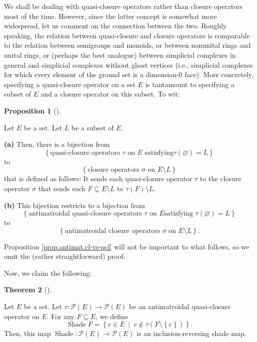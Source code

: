 \documentclass[numbers=enddot,12pt,final,onecolumn]{scrartcl}%
\theoremstyle{definition}
\newtheorem{theo}{Theorem}[section]
\newenvironment{theorem}[1][]
{\begin{theo}[#1]\begin{leftbar}}
{\end{leftbar}\end{theo}}
\newtheorem{prop}[theo]{Proposition}
\newenvironment{proposition}[1][]
{\begin{prop}[#1]\begin{leftbar}}
{\end{leftbar}\end{prop}}
\begin{document}
We shall be dealing with quasi-closure operators rather than closure operators
most of the time. However, since the latter concept is somewhat more
widespread, let us comment on the connection between the two. Roughly
speaking, the relation between quasi-closure and closure operators is
comparable to the relation between semigroups and monoids, or between
nonunital rings and unital rings, or (perhaps the best analogue) between
simplicial complexes in general and simplicial complexes without ghost
vertices (i.e., simplicial complexes for which every element of the ground set
is a dimension-$0$ face). More concretely, specifying a quasi-closure operator
on a set $E$ is tantamount to specifying a subset of $E$ and a closure
operator on this subset. To wit:

\begin{proposition}
\label{prop.antimat.cl-vs-qcl}Let $E$ be a set. Let $L$ be a subset of $E$.

\textbf{(a)} Then, there is a bijection from%
\[
\left\{  \text{quasi-closure operators }\tau\text{ on }E\text{ satisfying
}\tau\left(  \varnothing\right)  =L\right\}
\]
to%
\[
\left\{  \text{closure operators }\sigma\text{ on }E\setminus L\right\}
\]
that is defined as follows: It sends each quasi-closure operator $\tau$ to the
closure operator $\sigma$ that sends each $F\subseteq E\setminus L$ to
$\tau\left(  F\right)  \setminus L$.

\textbf{(b)} This bijection restricts to a bijection from%
\[
\left\{  \text{antimatroidal quasi-closure operators }\tau\text{ on }E\text{
satisfying }\tau\left(  \varnothing\right)  =L\right\}
\]
to%
\[
\left\{  \text{antimatroidal closure operators }\sigma\text{ on }E\setminus
L\right\}  .
\]

\end{proposition}

Proposition \ref{prop.antimat.cl-vs-qcl} will not be important to what
follows, so we omit the (rather straightforward) proof.

Now, we claim the following:

\begin{theorem}
\label{thm.antimat.Shade}Let $E$ be a set. Let $\tau:\mathcal{P}\left(
E\right)  \rightarrow\mathcal{P}\left(  E\right)  $ be an antimatroidal
quasi-closure operator on $E$. For any $F\subseteq E$, we define%
\begin{equation}
\operatorname*{Shade}F=\left\{  e\in E\ \mid\ e\notin\tau\left(
F\setminus\left\{  e\right\}  \right)  \right\}  .
\label{eq.thm.antimat.Shade.ShadeF=}%
\end{equation}
Then, this map $\operatorname*{Shade}:\mathcal{P}\left(  E\right)
\rightarrow\mathcal{P}\left(  E\right)  $ is an inclusion-reversing shade map.
\end{theorem}
\end{document}
